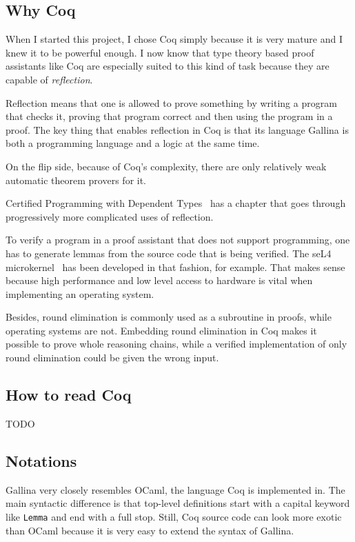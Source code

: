 \documentclass[english, 12pt, a4paper, sci, a-1b, online]{aaltothesis}
\newcommand\icoq[1]{\texttt{#1}}
\begin{document}
\subsection{Why Coq}

When I started this project, I chose Coq simply because it is very mature and I knew it to be powerful enough. I now know that type theory based proof assistants like Coq are especially suited to this kind of task because they are capable of \emph{reflection}.

Reflection means that one is allowed to prove something by writing a program that checks it, proving that program correct and then using the program in a proof. The key thing that enables reflection in Coq is that its language Gallina is both a programming language and a logic at the same time.

On the flip side, because of Coq's complexity, there are only relatively weak automatic theorem provers for it.

Certified Programming with Dependent Types~\cite{CPDT} has a chapter that goes through progressively more complicated uses of reflection.

To verify a program in a proof assistant that does not support programming, one has to generate lemmas from the source code that is being verified. The seL4 microkernel~\cite{sel4} has been developed in that fashion, for example. That makes sense because high performance and low level access to hardware is vital when implementing an operating system.

Besides, round elimination is commonly used as a subroutine in proofs, while operating systems are not. Embedding round elimination in Coq makes it possible to prove whole reasoning chains, while a verified implementation of only round elimination could be given the wrong input.

\subsection{How to read Coq}

TODO

\subsection{Notations}

Gallina very closely resembles OCaml, the language Coq is implemented in. The main syntactic difference is that top-level definitions start with a capital keyword like \icoq{Lemma} and end with a full stop. Still, Coq source code can look more exotic than OCaml because it is very easy to extend the syntax of Gallina.
\end{document}
